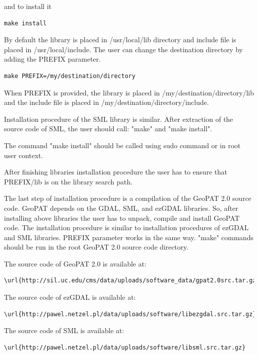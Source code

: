 \documentclass[12pt,margin=0.5in]{article}
\begin{document}
\begin{appendices}
and to install it

\begin{lstlisting}
make install
\end{lstlisting}

By default the library is placed in /usr/local/lib directory and
include file is placed in /usr/local/include.
The user can change the destination directory by adding the PREFIX parameter.

\begin{lstlisting}
make PREFIX=/my/destination/directory
\end{lstlisting}

When PREFIX is provided, the library is placed in
/my/destination/directory/lib and the include file is placed in
/my/destination/directory/include.

Installation procedure of the SML library is similar. After extraction of the source code of SML, the user should call: "make" and "make install".

The command "make install" should be called using sudo command or in
root user context.

After finishing libraries installation procedure the user has to ensure that
PREFIX/lib is on the library search path.

The last step of installation procedure is a compilation of the GeoPAT 2.0
source code. GeoPAT depends on the GDAL, SML, and ezGDAL libraries.
So, after installing above libraries the user has to unpack, compile
and install GeoPAT code.
The installation procedure is similar to installation procedures of
ezGDAL and SML libraries. PREFIX parameter works in the same way.
"make" commands should be run in the root GeoPAT 2.0 source code
directory.

The source code of GeoPAT 2.0 is available at:

\begin{lstlisting}[frame=single]
\url{http://sil.uc.edu/cms/data/uploads/software_data/gpat2.0src.tar.gz}
\end{lstlisting}

The source code of ezGDAL is available at:

\begin{lstlisting}[frame=single]
\url{http://pawel.netzel.pl/data/uploads/software/libezgdal.src.tar.gz}
\end{lstlisting}

The source code of SML is available at:

\begin{lstlisting}[frame=single]
\url{http://pawel.netzel.pl/data/uploads/software/libsml.src.tar.gz}
\end{lstlisting}


\end{appendices}
\end{document}
